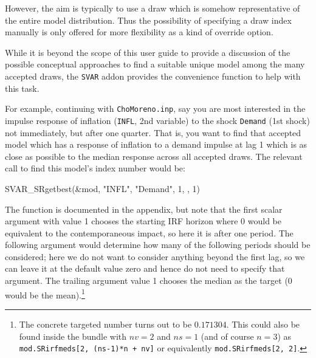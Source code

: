 \documentclass[a4paper,10pt]{article}
\newcommand{\dtk}[1]{\texttt{\detokenize{#1}}}
\begin{document}






However, the aim is typically to use a draw which is somehow representative of the entire 
model distribution. Thus the possibility of specifying a draw index manually is only offered for 
more flexibility as a kind of override option. 

While it is beyond the scope of this user guide to provide a discussion of the possible conceptual 
approaches to find a suitable unique model among the many accepted draws, the \texttt{SVAR}
addon provides the \dtk{SVAR_SRgetbest} convenience function to help with this task.

For example, continuing with \texttt{ChoMoreno.inp}, say you are most interested in the 
impulse response of inflation (\texttt{INFL}, 2nd variable) to the shock \texttt{Demand} 
(1st shock) not immediately, but after one quarter. 
That is, you want to find that accepted model which has a 
response of inflation to a demand impulse at lag 1 which is as close as 
possible to the median response across all accepted draws. 
The relevant call to find this model's index number would be:

 \begin{code}
 SVAR_SRgetbest(&mod, "INFL", "Demand", 1, , 1) 
 \end{code}

The function is documented in the appendix, but note that the first scalar argument with value 1 
chooses the starting IRF horizon where 0 would be equivalent to the contemporaneous impact,
so here it is after one period. The following argument would determine
how many of the following periods should be considered; here we do not want to consider anything 
beyond the first lag, so we can leave it at the default value zero and hence do not need to specify 
that argument. The trailing argument value 1 chooses the median as the target (0 would be 
the mean).\footnote{The concrete targeted number turns out to be  $0.171304$. This could also 
be found inside the bundle with $nv=2$ and $ns=1$ (and of course $n=3$) as
\texttt{mod.SRirfmeds[2, (ns-1)*n + nv]} or equivalently \texttt{mod.SRirfmeds[2, 2]}.}
\end{document}
